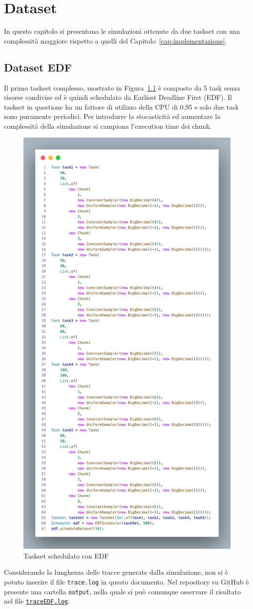 \chapter{Dataset}
In questo capitolo si presentano le simulazioni ottenute da due taskset con una complessità maggiore rispetto a quelli del Capitolo~\ref{cap:implementazione}.

\section{Dataset EDF}
Il primo taskset complesso, mostrato in Figura~\ref{fig:dataset1} è composto da 5 task senza risorse condivise ed è quindi schedulato da Earliest Deadline First (EDF). Il taskset in questione ha un fattore di utilizzo della CPU di 0,95 e solo due task sono puramente periodici. Per introdurre la stocasticità ed aumentare la complessità della simulazione si campiona l'execution time dei chunk.

\begin{figure}[htbp]
\includegraphics[width=.4\textwidth]{immagini/datasetEDF.pdf}
\centering
\caption{Taskset schedulato con EDF}
\label{fig:dataset1}
\end{figure}

Considerando la lunghezza delle tracce generate dalla simulazione, non si è potuto inserire il file \texttt{trace.log} in questo documento. Nel repository su GitHub è presente una cartella \texttt{output}, nella quale si può comunque osservare il risultato nel file \href{https://github.com/edoardosarri24/real-time-scheduling-simulator/blob/master/output/traceEDF.log}{\texttt{traceEDF.log}}.

